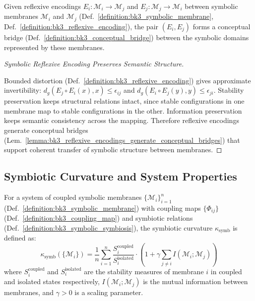 \begin{lemma} \label{lemma:bk3_reflexive_encodings_generate_conceptual_bridges}
Given reflexive encodings $E_i: \mathcal{M}_i \rightarrow \mathcal{M}_j$ and $E_j: \mathcal{M}_j \rightarrow \mathcal{M}_i$ between symbolic membranes $\mathcal{M}_i$ and $\mathcal{M}_j$ (Def.~\ref{definition:bk3_symbolic_membrane}, Def.~\ref{definition:bk3_reflexive_encoding}), the pair $(E_i, E_j)$ forms a conceptual bridge (Def.~\ref{definition:bk3_conceptual_bridge}) between the symbolic domains represented by these membranes.
\end{lemma}

\begin{proof}[Symbolic Reflexive Encoding Preserves Semantic Structure]
\label{proof:bk3_reflexive_encoding_preserves_structure}
\leavevmode

Bounded distortion (Def.~\ref{definition:bk3_reflexive_encoding}) gives
approximate invertibility:
$d_g(E_j \circ E_i(x), x) \leq \epsilon_{ij}$ and
$d_g(E_i \circ E_j(y), y) \leq \epsilon_{ji}$.
Stability preservation keeps structural relations intact, since stable
configurations in one membrane map to stable configurations in the other.
Information preservation keeps semantic consistency across the mapping.
Therefore reflexive encodings generate conceptual bridges
(Lem.~\ref{lemma:bk3_reflexive_encodings_generate_conceptual_bridges}) that
support coherent transfer of symbolic structure between membranes.
\end{proof}

\subsection{Symbiotic Curvature and System Properties} \label{subsec:bk3_symbiotic_curvature_system_properties}

\begin{definition} \label{definition:bk3_symbiotic_curvature}
For a system of coupled symbolic membranes $\{\mathcal{M}_i\}_{i=1}^n$ (Def.~\ref{definition:bk3_symbolic_membrane}) with coupling maps $\{\Phi_{ij}\}$ (Def.~\ref{definition:bk3_coupling_map}) and symbiotic relations (Def.~\ref{definition:bk3_symbolic_symbiosis}), the symbiotic curvature $\kappa_{\text{symb}}$ is defined as:
\[
\kappa_{\text{symb}}(\{\mathcal{M}_i\}) = \frac{1}{n}\sum_{i=1}^n \frac{S_i^{\text{coupled}}}{S_i^{\text{isolated}}} \cdot \left(1 + \gamma \sum_{j \neq i} I(\mathcal{M}_i; \mathcal{M}_j)\right)
\]
where $S_i^{\text{coupled}}$ and $S_i^{\text{isolated}}$ are the stability measures of membrane $i$ in coupled and isolated states respectively, $I(\mathcal{M}_i; \mathcal{M}_j)$ is the mutual information between membranes, and $\gamma > 0$ is a scaling parameter.
\end{definition}

